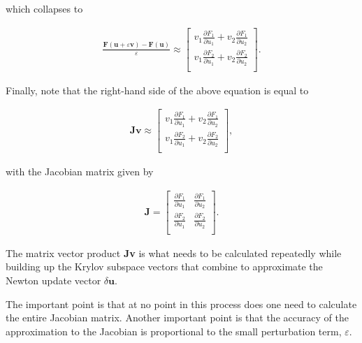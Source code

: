 which collapses to

\begin{align*}
\frac{\mathbf{F}\left( \mathbf{u}+\varepsilon \mathbf{v} \right)-\mathbf{F}\left( \mathbf{u} \right)}{\varepsilon }\approx\left[ \begin{matrix}
   v_{1}\frac{\partial F_{1}}{\partial u_{1}}+v_{2}\frac{\partial F_{1}}{\partial u_{2}}  \\
   v_{1}\frac{\partial F_{2}}{\partial u_{1}}+v_{2}\frac{\partial F_{2}}{\partial u_{2}}  \\
\end{matrix} \right].
\end{align*}

Finally, note that the right-hand side of the above equation is equal to 

\begin{align*}
\mathbf{Jv}\approx\left[ \begin{matrix}
   v_{1}\frac{\partial F_{1}}{\partial u_{1}}+v_{2}\frac{\partial F_{1}}{\partial u_{2}}  \\
   v_{1}\frac{\partial F_{2}}{\partial u_{1}}+v_{2}\frac{\partial F_{2}}{\partial u_{2}}  \\
\end{matrix} \right],
\end{align*}

with the Jacobian matrix given by

\begin{align*}
\mathbf{J}=\left[ \begin{matrix}
   \frac{\partial F_{1}}{\partial u_{1}} & \frac{\partial F_{1}}{\partial u_{2}}  \\
   \frac{\partial F_{2}}{\partial u_{1}} & \frac{\partial F_{2}}{\partial u_{2}}  \\
\end{matrix} \right].
\end{align*}

The matrix vector product \textbf{Jv} is what needs to be calculated repeatedly while building up the Krylov subspace vectors that combine to approximate the Newton update vector $\delta \mathbf{u}$.

The important point is that at no point in this process does one need to calculate the entire Jacobian matrix. Another important point is that the accuracy of the approximation to the Jacobian is proportional to the small perturbation term, $\varepsilon$.

